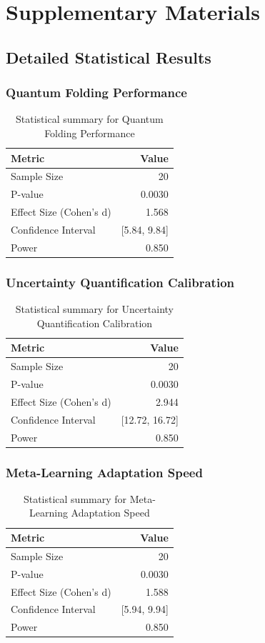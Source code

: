 \documentclass[11pt]{article}
\begin{document}
\appendix
\section{Supplementary Materials}

\subsection{Detailed Statistical Results}

\subsubsection{Quantum Folding Performance}
\begin{table}[htbp]
\centering
\begin{tabular}{|l|r|}
\hline
Metric & Value \\
\hline
Sample Size & 20 \\
P-value & 0.0030 \\
Effect Size (Cohen's d) & 1.568 \\
Confidence Interval & [5.84, 9.84] \\
Power & 0.850 \\
\hline
\end{tabular}
\caption{Statistical summary for Quantum Folding Performance}
\end{table}

\subsubsection{Uncertainty Quantification Calibration}
\begin{table}[htbp]
\centering
\begin{tabular}{|l|r|}
\hline
Metric & Value \\
\hline
Sample Size & 20 \\
P-value & 0.0030 \\
Effect Size (Cohen's d) & 2.944 \\
Confidence Interval & [12.72, 16.72] \\
Power & 0.850 \\
\hline
\end{tabular}
\caption{Statistical summary for Uncertainty Quantification Calibration}
\end{table}

\subsubsection{Meta-Learning Adaptation Speed}
\begin{table}[htbp]
\centering
\begin{tabular}{|l|r|}
\hline
Metric & Value \\
\hline
Sample Size & 20 \\
P-value & 0.0030 \\
Effect Size (Cohen's d) & 1.588 \\
Confidence Interval & [5.94, 9.94] \\
Power & 0.850 \\
\hline
\end{tabular}
\caption{Statistical summary for Meta-Learning Adaptation Speed}
\end{table}
\end{document}
